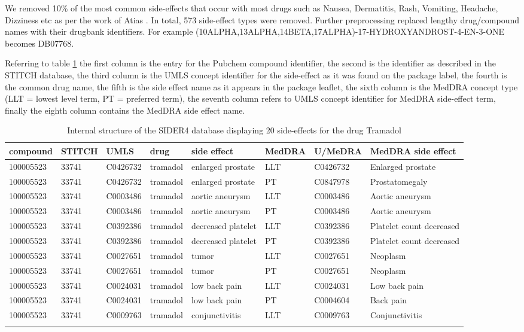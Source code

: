 \documentclass[preprint,12pt]{elsarticle}
\begin{document}
We removed 10\% of the most common side-effects that occur with most drugs such as Nausea, Dermatitis, Rash, Vomiting, Headache, Dizziness etc as per the work of Atias \cite{Atias2011}. In total, 573 side-effect types were removed. Further preprocessing replaced lengthy drug/compound names with their drugbank identifiers. For example (10ALPHA,13ALPHA,14BETA,17ALPHA)-17-HYDROXYANDROST-4-EN-3-ONE becomes DB07768.


Referring to table \ref{S4} the first column is the entry for the Pubchem compound identifier, the second is the identifier as described in the STITCH database, the third column is the UMLS concept identifier for the side-effect as it was found on the package label, the fourth is the common drug name, the fifth is the side effect name as it appears in the package leaflet, the sixth column is the  MedDRA concept type (LLT = lowest level term, PT = preferred term), the seventh column refers to UMLS concept identifier for MedDRA side-effect term, finally the eighth column contains the MedDRA side effect name.

\begin{table}[h]
\scriptsize
\centering \caption{Internal structure of the SIDER4 database displaying 20 side-effects for the  drug Tramadol}
\begin{tabular}{llllllll} \hline
 compound  & STITCH & UMLS  & drug  & side effect  & MedDRA & U/MeDRA & MedDRA side effect \\  \hline
100005523 & 33741 & C0426732 & tramadol & enlarged prostate & LLT & C0426732 & Enlarged prostate \\ 
 100005523 & 33741 & C0426732 & tramadol & enlarged prostate & PT & C0847978 & Prostatomegaly \\ 
100005523 & 33741 & C0003486 & tramadol & aortic aneurysm & LLT & C0003486 & Aortic aneurysm \\ 
100005523 & 33741 & C0003486 & tramadol & aortic aneurysm & PT & C0003486 & Aortic aneurysm \\ 
 100005523 & 33741 & C0392386 & tramadol & decreased platelet & LLT & C0392386 & Platelet count decreased \\ 
100005523 & 33741 & C0392386 & tramadol & decreased platelet & PT & C0392386 & Platelet count decreased \\ 
 100005523 & 33741 & C0027651 & tramadol & tumor & LLT & C0027651 & Neoplasm \\ 
 100005523 & 33741 & C0027651 & tramadol & tumor & PT & C0027651 & Neoplasm \\ 
100005523 & 33741 & C0024031 & tramadol & low back pain & LLT & C0024031 & Low back pain \\ 
100005523 & 33741 & C0024031 & tramadol & low back pain & PT & C0004604 & Back pain \\ 
100005523 & 33741 & C0009763 & tramadol & conjunctivitis & LLT & C0009763 & Conjunctivitis \\ 
   \hline
   \label{S4}
\end{tabular}
\end{table}
\normalsize
\end{document}
